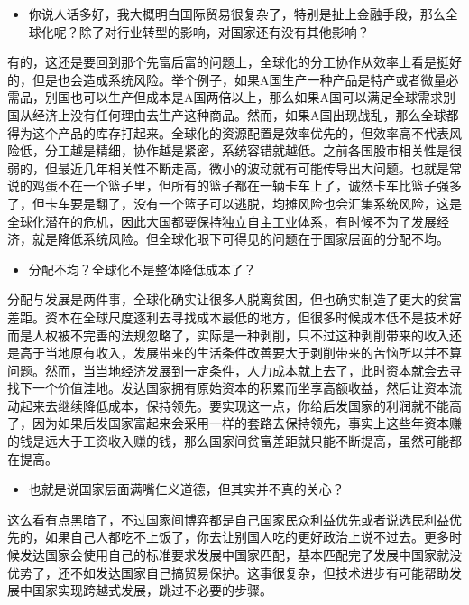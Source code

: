 \documentclass[
  letterpaper,
  DIV=11,
  numbers=noendperiod]{scrreprt}
\providecommand{\tightlist}{%
  \setlength{\itemsep}{0pt}\setlength{\parskip}{0pt}}\usepackage{longtable,booktabs,array}
\begin{document}
\begin{itemize}
\tightlist
\item
  你说人话多好，我大概明白国际贸易很复杂了，特别是扯上金融手段，那么全球化呢？除了对行业转型的影响，对国家还有没有其他影响？
\end{itemize}

有的，这还是要回到那个先富后富的问题上，全球化的分工协作从效率上看是挺好的，但是也会造成系统风险。举个例子，如果A国生产一种产品是特产或者微量必需品，别国也可以生产但成本是A国两倍以上，那么如果A国可以满足全球需求别国从经济上没有任何理由去生产这种商品。然而，如果A国出现战乱，那么全球都得为这个产品的库存打起来。全球化的资源配置是效率优先的，但效率高不代表风险低，分工越是精细，协作越是紧密，系统容错就越低。之前各国股市相关性是很弱的，但最近几年相关性不断走高，微小的波动就有可能传导出大问题。也就是常说的鸡蛋不在一个篮子里，但所有的篮子都在一辆卡车上了，诚然卡车比篮子强多了，但卡车要是翻了，没有一个篮子可以逃脱，均摊风险也会汇集系统风险，这是全球化潜在的危机，因此大国都要保持独立自主工业体系，有时候不为了发展经济，就是降低系统风险。但全球化眼下可得见的问题在于国家层面的分配不均。

\begin{itemize}
\tightlist
\item
  分配不均？全球化不是整体降低成本了？
\end{itemize}

分配与发展是两件事，全球化确实让很多人脱离贫困，但也确实制造了更大的贫富差距。资本在全球尺度逐利去寻找成本最低的地方，但很多时候成本低不是技术好而是人权被不完善的法规忽略了，实际是一种剥削，只不过这种剥削带来的收入还是高于当地原有收入，发展带来的生活条件改善要大于剥削带来的苦恼所以并不算问题。然而，当当地经济发展到一定条件，人力成本就上去了，此时资本就会去寻找下一个价值洼地。发达国家拥有原始资本的积累而坐享高额收益，然后让资本流动起来去继续降低成本，保持领先。要实现这一点，你给后发国家的利润就不能高了，因为如果后发国家富起来会采用一样的套路去保持领先，事实上这些年资本赚的钱是远大于工资收入赚的钱，那么国家间贫富差距就只能不断提高，虽然可能都在提高。

\begin{itemize}
\tightlist
\item
  也就是说国家层面满嘴仁义道德，但其实并不真的关心？
\end{itemize}

这么看有点黑暗了，不过国家间博弈都是自己国家民众利益优先或者说选民利益优先的，如果自己人都吃不上饭了，你去让别国人吃的更好政治上说不过去。更多时候发达国家会使用自己的标准要求发展中国家匹配，基本匹配完了发展中国家就没优势了，还不如发达国家自己搞贸易保护。这事很复杂，但技术进步有可能帮助发展中国家实现跨越式发展，跳过不必要的步骤。
\end{document}

